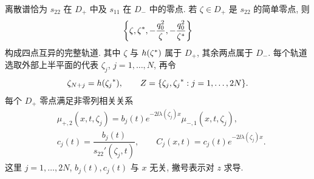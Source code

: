 \begin{proposition}\label{prop:quartet}
离散谱恰为 $s_{22}$ 在 $D_+$ 中及 $s_{11}$ 在 $D_-$ 中的零点. 若 $\zeta\in D_+$ 是 $s_{22}$ 的简单零点, 则
\begin{equation}\label{eq:quartet}
\left\{\zeta,{\zeta}^{*},-\dfrac{q_0^2}{\zeta},-\dfrac{q_0^2}{{\zeta}^{*}}\right\}
\end{equation}
构成四点互异的完整轨道. 其中 $\zeta$ 与 $h({\zeta}^{*})$ 属于 $D_+$, 其余两点属于 $D_-$. 每个轨道选取外部上半平面的代表 $\zeta_j$, $j=1,\ldots,N$, 再令
\begin{equation}\label{eq:discrete-indexing}
\zeta_{N+j}=h({\zeta_j}^{*}),\qquad
Z=\{\zeta_j,{\zeta_j}^{*}:j=1,\ldots,2N\}.
\end{equation}
每个 $D_+$ 零点满足非零列相关关系
\begin{equation}\label{eq:norming-definition}
\begin{aligned}
&\mu_{+,2}(x,t,\zeta_j)
=b_j(t)e^{-2\ii\lambda(\zeta_j)x}\mu_{-,1}(x,t,\zeta_j),\\
&c_j(t)=\dfrac{b_j(t)}{s_{22}'(\zeta_j,t)},\qquad
C_j(x,t)=c_j(t)e^{-2\ii\lambda(\zeta_j)x}.
\end{aligned}
\end{equation}
这里 $j=1,\ldots,2N$, $b_j(t),c_j(t)$ 与 $x$ 无关, 撇号表示对 $z$ 求导.
\end{proposition}

